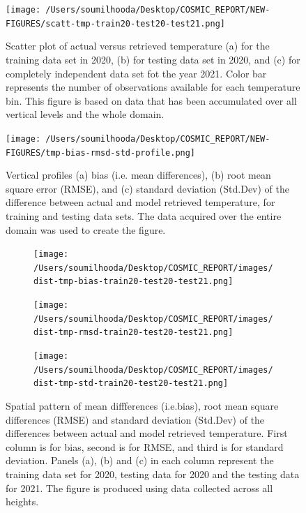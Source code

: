 \documentclass[a4paper,12pt,twoside]{article}
\begin{document}
\begin{figure}[H]
	\centering
	\texttt{[image: /Users/soumilhooda/Desktop/COSMIC\_REPORT/NEW-FIGURES/scatt-tmp-train20-test20-test21.png]}
	\caption{Scatter plot of actual versus retrieved temperature (a) for the training data set in 2020, (b) for testing data set in 2020, and (c) for completely independent data set fot the year 2021. Color bar represents the number of observations available for each temperature bin. This figure is based on data that has been accumulated over all vertical levels and the whole domain.}
	\label{fig:img20}
\end{figure}
\begin{figure}[H]
	\centering
	\texttt{[image: /Users/soumilhooda/Desktop/COSMIC\_REPORT/NEW-FIGURES/tmp-bias-rmsd-std-profile.png]}
\caption{Vertical profiles (a) bias (i.e. mean differences), (b) root mean square error (RMSE), and (c) standard deviation (Std.Dev) of the difference between actual and model retrieved temperature, for training and testing data sets. The data acquired over the entire domain was used to create the figure. }
	\label{fig:img21}
\end{figure}
\begin{figure}[H]
	\centering
	\begin{subfigure}{0.32\textwidth}
		\centering
		\texttt{[image: /Users/soumilhooda/Desktop/COSMIC\_REPORT/images/dist-tmp-bias-train20-test20-test21.png]}
	\end{subfigure}
	\hfill
	\begin{subfigure}{0.32\textwidth}
		\centering
		\texttt{[image: /Users/soumilhooda/Desktop/COSMIC\_REPORT/images/dist-tmp-rmsd-train20-test20-test21.png]}
	\end{subfigure}
	\hfill
	\begin{subfigure}{0.32\textwidth}
		\centering
		\texttt{[image: /Users/soumilhooda/Desktop/COSMIC\_REPORT/images/dist-tmp-std-train20-test20-test21.png]}
	\end{subfigure}
	\caption{Spatial pattern of mean diffferences (i.e.bias), root mean square differences (RMSE) and standard deviation (Std.Dev) of the differences between actual and model retrieved temperature. First column is for bias, second is for RMSE, and third is for standard deviation. Panels (a), (b) and (c) in each column represent the training data set for 2020, testing data for 2020 and the testing data for 2021. The figure is produced using data collected across all heights.}

\label{fig:img13}
\end{figure}
\end{document}
